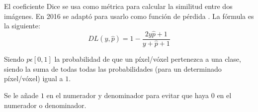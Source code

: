 El coeficiente Dice se usa como métrica para calcular la similitud entre dos imágenes. En 2016 se adaptó para usarlo como función de pérdida \cite{Cardoso2017}. La fórmula es la siguiente:
\begin{equation}
DL(y,\hat{p})= 1 - \frac{2y\hat{p}+1}{y+\hat{p}+1}
\end{equation}

Siendo $p\epsilon[0,1]$ la probabilidad de que un píxel/vóxel pertenezca a una clase, siendo la suma de todas todas las probabilidades (para un determinado píxel/vóxel) igual a $1$.

Se le añade $1$ en el numerador y denominador para evitar que haya $0$ en el numerador o denominador.

